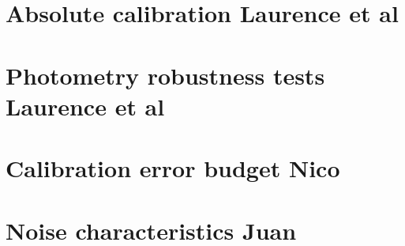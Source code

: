 \documentclass[a4paper, 11pt]{article} %
\begin{document}
\clearpage
\section{Absolute calibration {\color{blue} Laurence et al}}
\label{se:calibration}


\label{se:cal_HA}


\label{se:ref_flux_primaries}



\clearpage
\section{Photometry robustness tests {\color{blue} Laurence et al}}
\label{se:photometry}


\label{se:ref_flux_secondaries}


\label{se:cal_JFL}






\clearpage
\section{Calibration error budget {\color{blue} Nico}}
\label{se:error}



\clearpage
\section{Noise characteristics {\color{blue} Juan}}
\label{se:noise}

\end{document}
